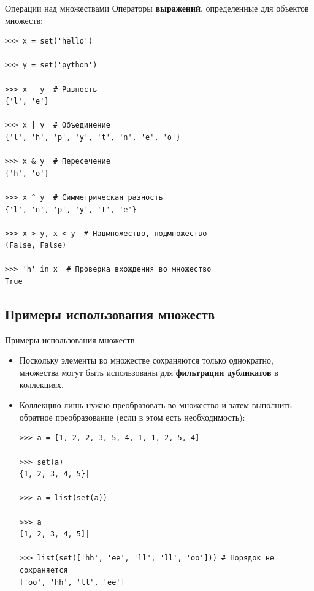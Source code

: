 \documentclass[aspectratio=169, mathserif]{beamer}%
\begin{document}
\begin{frame}[fragile]{Операции над множествами}
\scriptsize
Операторы \textcolor{extraorange}{\textbf{выражений}}, определенные для объектов множеств:

\begin{verbatim}
>>> x = set('hello')

>>> y = set('python')

>>> x - y  # Разность
{'l', 'e'}

>>> x | y  # Объединение
{'l', 'h', 'p', 'y', 't', 'n', 'e', 'o'}

>>> x & y  # Пересечение
{'h', 'o'}

>>> x ^ y  # Симметрическая разность
{'l', 'n', 'p', 'y', 't', 'e'}

>>> x > y, x < y  # Надмножество, подмножество
(False, False)

>>> 'h' in x  # Проверка вхождения во множество
True
\end{verbatim}
\vfill
\end{frame}

\subsection{Примеры использования множеств}

\begin{frame}[fragile]{Примеры использования множеств}
\scriptsize
\begin{itemize}
\item Поскольку элементы во множестве сохраняются только однократно, множества могут быть использованы для \textcolor{extraorange}{\textbf{фильтрации дубликатов}} в коллекциях. 
\item Коллекцию лишь нужно преобразовать во множество и затем выполнить обратное преобразование (если в этом есть необходимость):

\begin{verbatim}
>>> a = [1, 2, 2, 3, 5, 4, 1, 1, 2, 5, 4]

>>> set(a)
{1, 2, 3, 4, 5}|

>>> a = list(set(a))

>>> a
[1, 2, 3, 4, 5]|

>>> list(set(['hh', 'ee', 'll', 'll', 'oo'])) # Порядок не сохраняется
['oo', 'hh', 'll', 'ee']
\end{verbatim}
\end{itemize}
\vfill
\end{frame}
\end{document}
